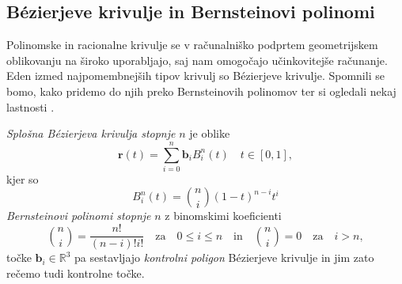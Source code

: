 \documentclass[12pt,a4paper,twoside]{article}
\theoremstyle{definition} %
\theoremstyle{plain} %
\theoremstyle{primerstyle}
\numberwithin{equation}{section}  %
\newcommand{\R}{\mathbb R}
\newcommand{\bV}{\mathbf{b}}
\newcommand{\rV}{\mathbf{r}}
\begin{document}
\subsection{Bézierjeve krivulje in Bernsteinovi polinomi}
\label{bern_poli_bez_kri_poglavje}
Polinomske in racionalne krivulje se v računalniško podprtem geometrijskem oblikovanju na široko uporabljajo, saj nam omogočajo učinkovitejše računanje. Eden izmed najpomembnejših tipov krivulj so Bézierjeve krivulje. Spomnili se bomo, kako pridemo do njih preko Bernsteinovih polinomov ter si ogledali nekaj lastnosti \cite{farin2002handbook}.

\emph{Splošna Bézierjeva krivulja stopnje} $n$ je oblike
\begin{equation}
	\label{splosna_bezier}
	\rV(t)=\sum_{i=0}^n\bV_iB_i^n(t)\quad t\in[0,1],
\end{equation}
kjer so
\begin{equation}
	\label{splosni_bernstein}
	B_i^n(t)=\binom{n}{i}(1-t)^{n-i}t^i
\end{equation}
\emph{Bernsteinovi polinomi stopnje} $n$ z binomskimi koeficienti
$$\binom{n}{i}=\frac{n!}{(n-i)!i!}\quad\text{za}\quad 0\leq i \leq n\quad\text{in}\quad\binom{n}{i}=0\quad\text{za}\quad i>n,$$
točke $\bV_i\in\R^3$ pa sestavljajo \emph{kontrolni poligon} Bézierjeve krivulje in jim zato rečemo tudi kontrolne točke.
\pagebreak
\end{document}
